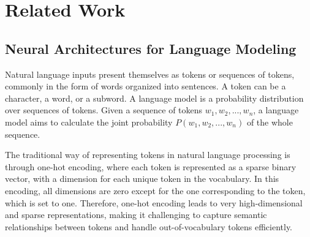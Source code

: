 \chapter{Related Work}
\label{chapter:related}


\renewcommand{\leftmark}{\spacedlowsmallcaps{Related work}}


\minitoc



\section{Neural Architectures for Language Modeling}



Natural language inputs present themselves as tokens or sequences of tokens, commonly in the form of words organized into sentences. A token can be a character, a word, or a subword. A language model is a probability distribution over sequences of tokens. Given a sequence of tokens $w_1, w_2, ..., w_n$, a language model aims to calculate the joint probability $P(w_1, w_2, ..., w_n)$ of the whole sequence. 

The traditional way of representing tokens in natural language processing is through one-hot encoding, where each token is represented as a sparse binary vector, with a dimension for each unique token in the vocabulary. In this encoding, all dimensions are zero except for the one corresponding to the token, which is set to one. Therefore, one-hot encoding leads to very high-dimensional and sparse representations, making it challenging to capture semantic relationships between tokens and handle out-of-vocabulary tokens efficiently.

